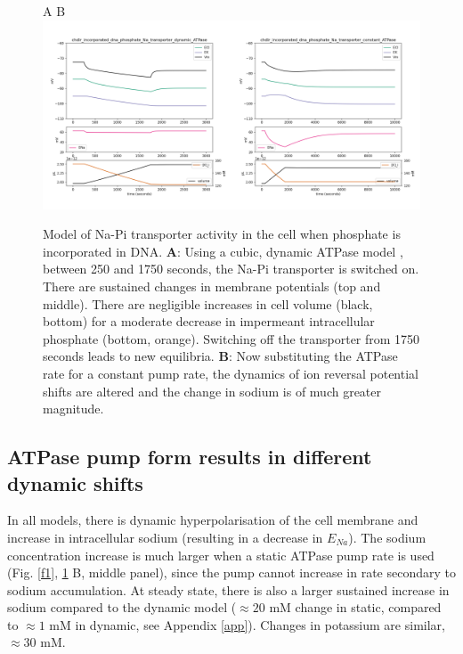 \documentclass[11pt]{article}[]
\begin{document}
\begin{figure}[h]
\centering A  \hskip 80mm B \\
\includegraphics[width=0.5\textwidth]{images/chdir_incorporated_dna_phosphate_Na_transporter_dynamic_ATPase.png}\includegraphics[width=0.5\textwidth]{images/chdir_incorporated_dna_phosphate_Na_transporter_constant_ATPase.png}
\caption{Model of Na-Pi transporter activity in the cell when phosphate is incorporated in DNA. \textbf{A}: Using a cubic, dynamic ATPase model \cite{Dusterwald2018}, between 250 and 1750 seconds, the Na-Pi transporter is switched on. There are sustained changes in membrane potentials (top and middle). There are negligible increases in cell volume (black, bottom) for a moderate decrease in impermeant intracellular phosphate (bottom, orange). Switching off the transporter from 1750 seconds leads to new equilibria. \textbf{B}: Now substituting the ATPase rate for a constant pump rate, the dynamics of ion reversal potential shifts are altered and the change in sodium is of much greater magnitude. \label{f2}}
\end{figure}

\subsection{ATPase pump form results in different dynamic shifts}
In all models, there is dynamic hyperpolarisation of the cell membrane and increase in intracellular sodium (resulting in a decrease in $E_{Na}$). The sodium concentration increase is much larger when a static ATPase pump rate is used (Fig. \ref{f1}, \ref{f2} B, middle panel), since the pump cannot increase in rate secondary to sodium accumulation. At steady state, there is also a larger sustained increase in sodium compared to the dynamic model ($\approx 20$ mM change in static, compared to $\approx 1$ mM in dynamic, see Appendix \ref{app}). Changes in potassium are similar, $\approx 30$ mM. 
\end{document}
